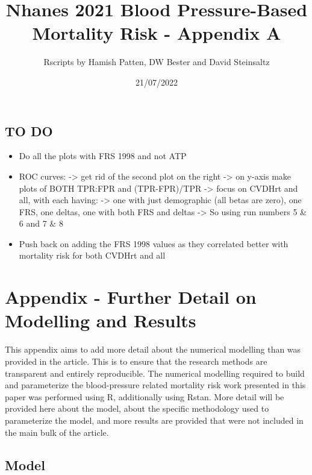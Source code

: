 \documentclass[
]{article}
\title{Nhanes 2021 Blood Pressure-Based Mortality Risk - Appendix A}
\author{Rscripts by Hamish Patten, DW Bester and David Steinsaltz}
\date{21/07/2022}
\providecommand{\tightlist}{%
  \setlength{\itemsep}{0pt}\setlength{\parskip}{0pt}}
\begin{document}
\maketitle

{
\setcounter{tocdepth}{3}
\tableofcontents
}
\hypertarget{to-do}{%
\subsection{TO DO}\label{to-do}}

\begin{itemize}
\tightlist
\item
  Do all the plots with FRS 1998 and not ATP
\item
  ROC curves: -\textgreater{} get rid of the second plot on the right
  -\textgreater{} on y-axis make plots of BOTH TPR:FPR and (TPR-FPR)/TPR
  -\textgreater{} focus on CVDHrt and all, with each having:
  -\textgreater{} one with just demographic (all betas are zero), one
  FRS, one deltas, one with both FRS and deltas -\textgreater{} So using
  run numbers 5 \& 6 and 7 \& 8
\item
  Push back on adding the FRS 1998 values as they correlated better with
  mortality risk for both CVDHrt and all
\end{itemize}

\hypertarget{appendix---further-detail-on-modelling-and-results}{%
\section{Appendix - Further Detail on Modelling and
Results}\label{appendix---further-detail-on-modelling-and-results}}

This appendix aims to add more detail about the numerical modelling than
was provided in the article. This is to ensure that the research methods
are transparent and entirely reproducible. The numerical modelling
required to build and parameterize the blood-pressure related mortality
risk work presented in this paper was performed using R, additionally
using Rstan. More detail will be provided here about the model, about
the specific methodology used to parameterize the model, and more
results are provided that were not included in the main bulk of the
article.

\hypertarget{model}{%
\subsection{Model}\label{model}}
\end{document}
